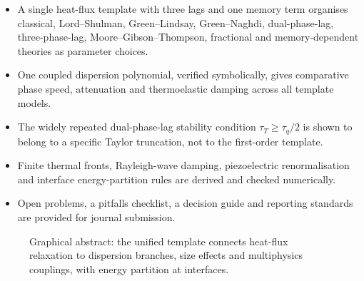 \documentclass[review,12pt]{elsarticle}
\begin{document}
\linenumbers

\begin{tcolorbox}[enhanced, breakable, colback=blue!5, colframe=blue!75!black,
  arc=0mm, boxrule=0.8pt, title={Highlights}, fonttitle=\bfseries\small,
  coltitle=black, left=2mm, right=2mm, top=1mm, bottom=1mm]
\begin{itemize}[nosep]
\item A single heat-flux template with three lags and one memory term organises classical, Lord--Shulman, Green--Lindsay, Green--Naghdi, dual-phase-lag, three-phase-lag, Moore--Gibson--Thompson, fractional and memory-dependent theories as parameter choices.
\item One coupled dispersion polynomial, verified symbolically, gives comparative phase speed, attenuation and thermoelastic damping across all template models.
\item The widely repeated dual-phase-lag stability condition $\tau_T\ge\tau_q/2$ is shown to belong to a specific Taylor truncation, not to the first-order template.
\item Finite thermal fronts, Rayleigh-wave damping, piezoelectric renormalisation and interface energy-partition rules are derived and checked numerically.
\item Open problems, a pitfalls checklist, a decision guide and reporting standards are provided for journal submission.
\end{itemize}
\end{tcolorbox}

\begin{figure}[t!]
\centering
{}
\caption{Graphical abstract: the unified template connects heat-flux relaxation to dispersion branches, size effects and multiphysics couplings, with energy partition at interfaces.}\label{fig:graphical}
\end{figure}
\end{document}
